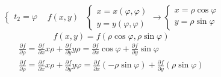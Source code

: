 \begin{teorema}
\begin{equation*}
\begin{matrix}
\begin{cases}
					t_2=\varphi
				\end{cases} & f(x,y) &
				\begin{cases}
					x=x(\varphi,\varphi)\\
					y=y(\varphi,\varphi)
				\end{cases}\to \begin{cases}
					x=\rho\cos \varphi\\
					y=\rho \sin \varphi
				\end{cases}
			\end{matrix}
		\end{equation*}
		\begin{equation*}
			f(x,y)=f(\rho\cos\varphi,\rho \sin \varphi)
		\end{equation*}
		\begin{equation*}
			\begin{matrix}
				\frac{\partial f}{\partial \rho}=\frac{\partial f}{\partial x}
				x\rho+\frac{\partial f}{\partial y}y\rho=
				\frac{\partial f}{\partial x} \cos \varphi+
				\frac{\partial f}{\partial y} \sin \varphi\\
				\frac{\partial f}{\partial \rho}=\frac{\partial f}{\partial x}
				x\rho+\frac{\partial f}{\partial y}y\varphi=
				\frac{\partial f}{\partial x} (-\rho\sin \varphi)+
				\frac{\partial f}{\partial y} (\rho\sin \varphi)
			\end{matrix}
		\end{equation*}
\end{teorema}
